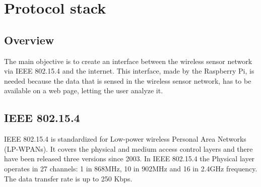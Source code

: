 \section{Protocol stack}
\subsection{Overview}
The main objective is to create an interface between the wireless sensor network via IEEE 802.15.4 and the internet. This interface, made by the Raspberry Pi, is needed because the data that is sensed in the wireless sensor network, has to be available on a web page, letting the user analyze it. \\
\subsection{IEEE 802.15.4}
IEEE 802.15.4 is standardized for Low-power wireless Personal Area Networks (LP-WPANs). It covers the physical and medium access control layers and there have been released three versions since 2003.
In IEEE 802.15.4 the Physical layer operates in 27 channels: 1 in 868MHz, 10 in 902MHz and 16 in 2.4GHz frequency. The data transfer rate is up to 250 Kbps.\cite{slide}\\
